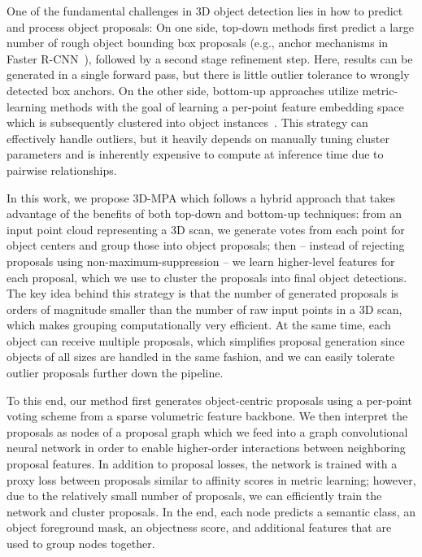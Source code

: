 \documentclass[10pt,twocolumn,letterpaper]{article}
\newcommand{\name}{3D-MPA}
\begin{document}
One of the fundamental challenges in 3D object detection lies in how to predict and process object proposals:
On one side, top-down methods first predict a large number of rough object bounding box proposals (e.g., anchor mechanisms in Faster R-CNN~\cite{Shaoqing15NIPS}), followed by a second stage refinement step.
Here, results can be generated in a single forward pass, but there is little outlier tolerance to wrongly detected box anchors.
On the other side, bottom-up approaches utilize metric-learning methods with the goal of learning a per-point feature embedding space which is subsequently clustered into object instances~\cite{ElichGCPR19,Lahoud19ICCV,liu2019masc}.
This strategy can effectively handle outliers, but it heavily depends on manually tuning cluster parameters and is inherently expensive to compute at inference time due to  pairwise relationships.

In this work, we propose \name{} which follows a hybrid approach that takes advantage of the benefits of both top-down and bottom-up techniques: 
from an input point cloud representing a 3D scan, we generate votes from each point for object centers and group those into object proposals; then -- instead of rejecting proposals using non-maximum-suppression -- we learn higher-level features for each proposal, which we use to cluster the proposals into final object detections. 
The key idea behind this strategy is that the number of generated proposals is orders of magnitude smaller than the number of raw input points in a 3D scan, which makes grouping computationally very efficient.
At the same time, each object can receive multiple proposals, which simplifies proposal generation since objects of all sizes are handled in the same fashion, and we can easily tolerate outlier proposals further down the pipeline.

To this end, our method first generates object-centric proposals using a per-point voting scheme from a sparse volumetric feature backbone.
We then interpret the proposals as nodes of a proposal graph which we feed into a graph convolutional neural network in order to enable higher-order interactions between neighboring proposal features.
In addition to proposal losses, the network is trained with a proxy loss between proposals similar to affinity scores in metric learning;
however, due to the relatively small number of proposals, we can efficiently train the network and cluster proposals.
In the end, each node predicts a semantic class, an object foreground mask, an objectness score, and additional features that are used to group nodes together.
\end{document}
